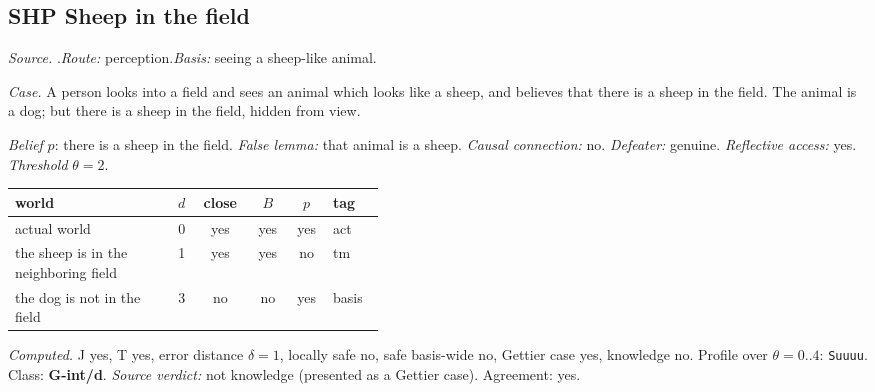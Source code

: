 \subsection*{SHP \enspace Sheep in the field}
\noindent\textit{Source.} \citet{Chisholm1966}.\quad \textit{Route:} perception.\quad \textit{Basis:} seeing a sheep-like animal.\par
\noindent\textit{Case.} A person looks into a field and sees an animal which looks like a sheep, and believes that there is a sheep in the field. The animal is a dog; but there is a sheep in the field, hidden from view.\par
\noindent\textit{Belief} $p$: there is a sheep in the field.
 \textit{False lemma:} that animal is a sheep. \textit{Causal connection:} no. \textit{Defeater:} genuine. \textit{Reflective access:} yes. \textit{Threshold} $\theta = 2$.\par
\begin{center}\begin{tabular}{@{}p{0.43\linewidth}rcccl@{}}
world & $d$ & close & $B$ & $p$ & tag \\ \midrule
actual world & 0 & yes & yes & yes & act \\
the sheep is in the neighboring field & 1 & yes & yes & no & tm \\
the dog is not in the field & 3 & no & no & yes & basis \\
\end{tabular}\end{center}
\noindent\textit{Computed.} J yes, T yes, error distance $\delta = 1$, locally safe no, safe basis-wide no, Gettier case yes, knowledge no. Profile over $\theta = 0..4$: \texttt{Suuuu}. Class: \textbf{G-int/d}.
 \textit{Source verdict:} not knowledge (presented as a Gettier case). Agreement: yes.
\par\medskip
{}
